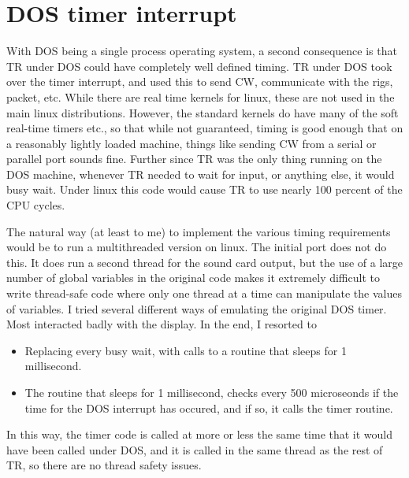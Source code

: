 \documentclass[12pt]{article}
\begin{document}
\section{DOS timer interrupt}
With DOS being a single process operating system, a second consequence is
that TR under DOS could have completely well defined timing. TR under DOS
took over the timer interrupt, and used this to send CW, communicate with
the rigs, packet, etc. While there are real time kernels for linux,
these are not used in the main linux distributions. However, the
standard kernels do have many of the soft real-time timers etc., so that
while not guaranteed, timing is good enough that on a reasonably
lightly loaded machine, things like sending CW from a serial or parallel
port sounds fine. Further since TR was the only thing running on the DOS
machine, whenever TR needed to wait for input, or anything else, it would
busy wait. Under linux this code would cause TR to use nearly 100 percent
of the CPU cycles.

The natural way (at least to me) to implement the various timing requirements
would be to run a multithreaded version on linux. The initial port does
not do this. It does run a second thread for the sound card output, but
the use of a large number of global variables in the original code makes
it extremely difficult to write thread-safe code where only one thread
at a time can manipulate the values of variables. I tried several different
ways of emulating the original DOS timer. Most interacted badly with
the display. In the end, I resorted to
\begin{itemize}
\item
Replacing every busy wait, with calls to a routine that sleeps for
1 millisecond.
\item
The routine that sleeps for 1 millisecond, checks every 500 microseonds
if the time for the DOS interrupt has occured, and if so, it calls
the timer routine.
\end{itemize}
In this way, the timer code is called at more or less the same
time that it would have been called under DOS, and it is called in the
same thread as the rest of TR, so there are no thread safety issues.
\end{document}
